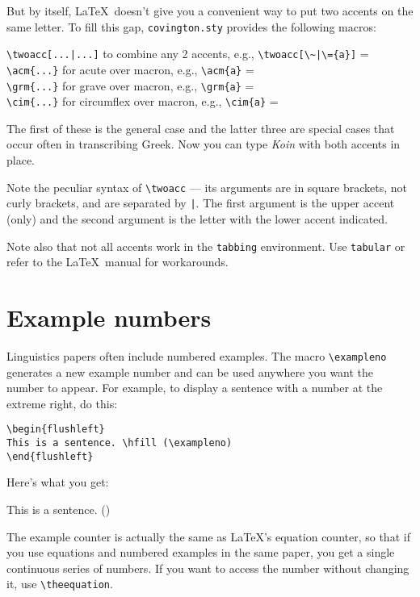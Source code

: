 \documentclass{article}
\begin{document}
But by itself, \LaTeX\ doesn't give you a convenient way to put two
accents on the same letter.  To fill this gap, \texttt{covington.sty} provides
the following macros:
\begin{flushleft}
\verb,\twoacc[...|...], \quad to combine any 2 accents, e.g.,
               \verb.\twoacc[\~|\={a}]. = \twoacc[\~|\={a}]\\[6pt]
\verb,\acm{...}, \quad for acute over macron, e.g., \verb.\acm{a}. = \\
\verb,\grm{...}, \quad for grave over macron, e.g., \verb.\grm{a}. = \\
\verb,\cim{...}, \quad for circumflex over macron, e.g., \verb.\cim{a}. = 
\end{flushleft}
The first of these is the general case and the latter three are special
cases that occur often in transcribing Greek.  Now you can type
\emph{Koin} with both accents in place.

Note the peculiar syntax of \verb.\twoacc. --- its arguments are in
square brackets, not curly brackets, and are separated by \verb.|..
The first argument is the upper accent (only) and the second argument
is the letter with the lower accent indicated.

Note also that not all accents work in the \texttt{tabbing} environment.
Use \texttt{tabular} or refer to the \LaTeX\ manual for workarounds.

\section{Example numbers}

Linguistics papers often include numbered examples.
The macro \verb"\exampleno" generates a new example number and can be 
used anywhere you want the number to appear.  For example, to display a 
sentence with a number at the extreme right, do this:
\begin{verbatim}
\begin{flushleft}
This is a sentence. \hfill (\exampleno)
\end{flushleft}
\end{verbatim}
Here's what you get:
\begin{flushleft}
This is a sentence. \hfill (\exampleno)
\end{flushleft}
The example counter is actually the same as \LaTeX's equation counter, 
so that if you use equations and numbered examples in the same
paper, you get a single continuous series of numbers. If you want to 
access the number without changing it, use \verb"\theequation".
\end{document}
